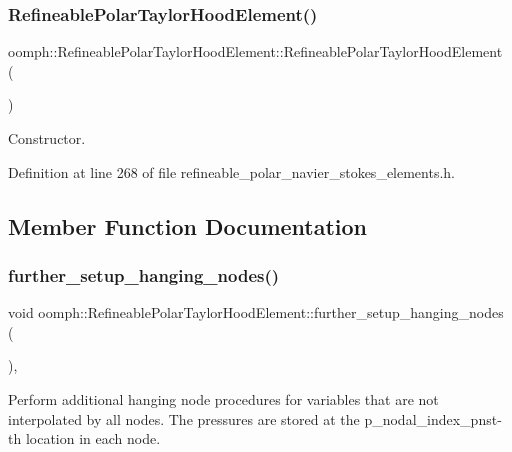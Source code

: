 \subsubsection{\texorpdfstring{Refineable\+Polar\+Taylor\+Hood\+Element()}{RefineablePolarTaylorHoodElement()}}
{\footnotesize\ttfamily oomph\+::\+Refineable\+Polar\+Taylor\+Hood\+Element\+::\+Refineable\+Polar\+Taylor\+Hood\+Element (\begin{DoxyParamCaption}{ }\end{DoxyParamCaption})\hspace{0.3cm}{\ttfamily [inline]}}



Constructor. 



Definition at line 268 of file refineable\+\_\+polar\+\_\+navier\+\_\+stokes\+\_\+elements.\+h.



\subsection{Member Function Documentation}
\mbox{\label{classoomph_1_1RefineablePolarTaylorHoodElement_aee481f421b3b57536ba7a929f760a337}} 
\subsubsection{\texorpdfstring{further\+\_\+setup\+\_\+hanging\+\_\+nodes()}{further\_setup\_hanging\_nodes()}}
{\footnotesize\ttfamily void oomph\+::\+Refineable\+Polar\+Taylor\+Hood\+Element\+::further\+\_\+setup\+\_\+hanging\+\_\+nodes (\begin{DoxyParamCaption}{ }\end{DoxyParamCaption})\hspace{0.3cm}{\ttfamily [inline]}, {\ttfamily [virtual]}}



Perform additional hanging node procedures for variables that are not interpolated by all nodes. The pressures are stored at the p\+\_\+nodal\+\_\+index\+\_\+pnst-\/th location in each node. 



